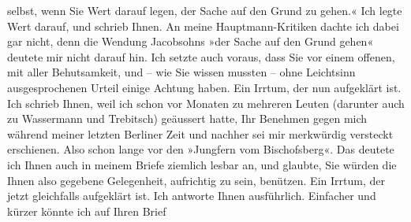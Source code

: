 \begin{ledgroupsized}[t]{13cm}
               selbst, wenn Sie Wert darauf legen, der Sache auf den Grund zu gehen.«\pend
           \pstart
           Ich legte Wert darauf, und schrieb Ihnen. An meine Hauptmann-Kritiken dachte ich dabei
               gar nicht, denn die Wendung Jacobsohns »der
               Sache auf den Grund gehen« deutete mir nicht darauf hin. Ich setzte auch voraus, dass
               Sie vor einem offenen, mit aller Behutsamkeit, und – wie Sie wissen mussten – ohne
               Leichtsinn ausgesprochenen Urteil einige Achtung haben. Ein Irrtum, der nun
               aufgeklärt ist.\pend
           \pstart
           Ich schrieb Ihnen, weil ich schon vor Monaten zu mehreren Leuten (darunter auch zu
                  Wassermann und Trebitsch) geäussert hatte, Ihr Benehmen gegen mich während
               meiner letzten Berliner Zeit und nachher sei mir
               merkwürdig versteckt erschienen. Also schon lange vor den »Jungfern vom Bischofsberg«. Das deutete ich Ihnen auch in
               meinem Briefe ziemlich lesbar an, und glaubte, Sie würden die Ihnen also gegebene
               Gelegenheit, aufrichtig zu sein, benützen. Ein Irrtum, der jetzt gleichfalls
               aufgeklärt ist.\pend
           \pstart
           Ich antworte Ihnen ausführlich. Einfacher und kürzer {\pb}könnte ich auf Ihren Brief

\end{ledgroupsized}
